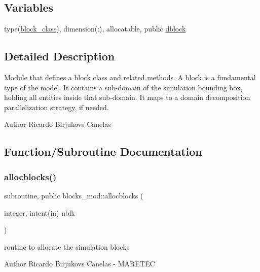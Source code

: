 \subsection*{Variables}
\begin{DoxyCompactItemize}
\item 
type(\mbox{\hyperlink{structblocks__mod_1_1block__class}{block\+\_\+class}}), dimension(\+:), allocatable, public \mbox{\hyperlink{namespaceblocks__mod_ac8ad6e3cf7a812f95dadb592336aca50}{dblock}}
\end{DoxyCompactItemize}


\subsection{Detailed Description}
Module that defines a block class and related methods. A block is a fundamental type of the model. It contains a sub-\/domain of the simulation bounding box, holding all entities inside that sub-\/domain. It maps to a domain decomposition parallelization strategy, if needed. 

\begin{DoxyAuthor}{Author}
Ricardo Birjukovs Canelas 
\end{DoxyAuthor}


\subsection{Function/\+Subroutine Documentation}
\mbox{\label{namespaceblocks__mod_a639beb0fee2290d46353f4b4702d6711}} 
\subsubsection{\texorpdfstring{allocblocks()}{allocblocks()}}
{\footnotesize\ttfamily subroutine, public blocks\+\_\+mod\+::allocblocks (\begin{DoxyParamCaption}\item[{integer, intent(in)}]{nblk }\end{DoxyParamCaption})}



routine to allocate the simulation blocks 

\begin{DoxyAuthor}{Author}
Ricardo Birjukovs Canelas -\/ M\+A\+R\+E\+T\+EC
\end{DoxyAuthor}

